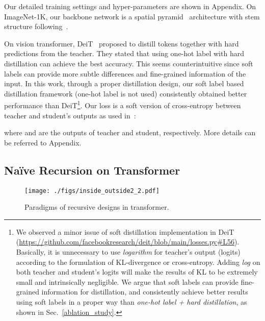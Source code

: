 \documentclass[runningheads]{llncs}
\begin{document}
	 Our detailed training settings and hyper-parameters are shown in Appendix.  On ImageNet-1K, our backbone network is a spatial pyramid~\cite{heo2021rethinking} architecture with stem structure following~\cite{shen2017dsod}.
	
	 On vision transformer, DeiT~\cite{touvron2020training} proposed to distill tokens together with hard predictions from the teacher. They stated that using one-hot label with hard distillation can achieve the best accuracy. This seems counterintuitive since soft labels can provide more subtle differences and fine-grained information of the input. In this work, through a proper distillation design, our soft label based distillation framework (one-hot label is not used) consistently obtained better performance than DeiT\footnote{We observed a minor 
		issue of soft distillation implementation in DeiT (\url{https://github.com/facebookresearch/deit/blob/main/losses.py\#L56}). Basically, it is unnecessary to use {\em logarithm} for teacher's output (logits) according to the formulation of KL-divergence or cross-entropy. Adding {\em log} on both teacher and student's logits will make the results of KL to be extremely small and intrinsically negligible. 
		We argue that soft labels can provide fine-grained information for distillation, and consistently achieve better results using soft labels in a proper way than {\em one-hot label + hard distillation}, as shown in Sec.~\ref{ablation_study}.}. Our loss is a soft version of cross-entropy between teacher and student's outputs as used in~\cite{shen2021is,romero2014fitnets,shen2019meal,bagherinezhad2018label}:
	
	where  and  are the outputs of teacher and student, respectively. More details can be referred to Appendix.
	
	\subsection{Na\"ive Recursion on Transformer}
	
	\begin{wrapfigure}{r}{4.2cm}
		\vspace{-0.4in}\centering
		\texttt{[image: ./figs/inside\_outside2\_2.pdf]}\vspace{-0.1in}
		\caption{Paradigms of recursive designs in transformer.}
		\label{fig:inside_outside}\vspace{-0.3in}
	\end{wrapfigure}
	
\end{document}
